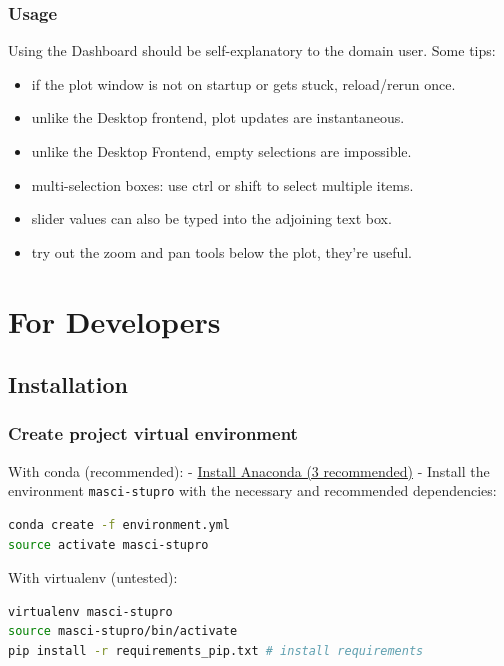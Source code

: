 \subsubsection{Usage}\label{usage-1}

Using the Dashboard should be self-explanatory to the domain user. Some
tips:

\begin{itemize}
    \tightlist
\item if the plot window is not on startup or gets stuck, reload/rerun once.
\item unlike the Desktop frontend, plot updates are instantaneous.
\item unlike the Desktop Frontend, empty selections are impossible.   
\item multi-selection boxes: use ctrl or shift to select multiple items. 
\item slider values can also be typed into the adjoining text box.
\item try out the zoom and pan tools below the plot, they're useful.
\end{itemize}

\section{For Developers}\label{for-developers}

\subsection{Installation}\label{installation-1}

\subsubsection{Create project virtual
  environment}\label{create-project-virtual-environment}

With conda (recommended): -
\href{https://www.anaconda.com/download}{Install Anaconda (3
  recommended)} - Install the environment \texttt{masci-stupro} with the
necessary and recommended dependencies:

\begin{lstlisting}[language=bash, style=code]
conda create -f environment.yml
source activate masci-stupro
\end{lstlisting}

With virtualenv (untested):

\begin{lstlisting}[language=bash, style=code]
virtualenv masci-stupro
source masci-stupro/bin/activate
pip install -r requirements_pip.txt # install requirements
\end{lstlisting}


